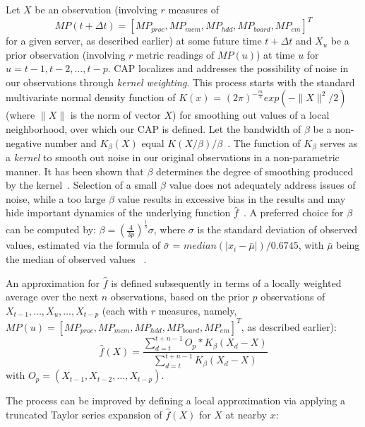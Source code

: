 \documentclass[prodmode,acmtaco,pdftex]{acmsmall}
\begin{document}
Let $X$ be an observation (involving $r$ measures of 
\begin{equation*}
MP(t+\Delta t) =[MP_{proc},MP_{mem}, MP_{hdd}, MP_{board}, MP_{em}]^{T}
\end{equation*}
for a given server, as described earlier) at some future time $t+\Delta
t$ and $X_{u}$ be a prior observation (involving $r$ metric readings of
$MP(u)$) at time $u$ for $u=t-1, t-2, \dots, t-p$.  CAP localizes and
addresses the possibility of noise in our observations through
\textit{kernel weighting}.  This process starts with the standard
multivariate normal density function of $K(x)$ =
$(2\pi)^{-\frac{m}{2}}exp(-\|X\|^{2}/2)$ (where $\|X\|$ is the norm of
vector $X$) for smoothing out values of a local neighborhood, over which
our CAP is defined.  Let the bandwidth of $\beta$ be a non-negative
number and $K_{\beta}(X)$ equal $K(X/\beta)/\beta$~\cite{Fan1996}.  The
function of $K_{\beta}$ serves as a \textit{kernel} to smooth out noise
in our original observations in a non-parametric manner.  It has been
shown that $\beta$ determines the degree of smoothing produced by the
kernel~\cite{Fan2005}.  Selection of a small $\beta$ value does not
adequately address issues of noise, while a too large $\beta$ value
results in excessive bias in the results and may hide important dynamics
of the underlying function $\hat{f}$~\cite{Turlach1993}.  A preferred
choice for $\beta$ can be computed by: $\beta =
\left(\frac{4}{3p}\right)^{\frac{1}{5}}\sigma$, where $\sigma$ is the
standard deviation of observed values, estimated via the formula of
$\bar{\sigma}$ = $median(|x_{i}-\bar{\mu}|)/0.6745$, with $\bar{\mu}$
being the median of observed values ~\cite{Bowman1997}.
 
An approximation for $\hat{f}$ is defined subsequently in terms of
a locally weighted average \cite{Box1994,Fan1996} over the next
$n$ observations, based on the prior $p$ observations of $X_{t-1},
\ldots, X_{u}, \ldots, X_{t-p}$ (each with $r$ measures, namely,
$MP(u) = \left[MP_{proc}, MP_{mem}, MP_{hdd}, MP_{board}, MP_{em}\right]^{T}$,
as described earlier):
  \begin{equation}
    \label{eq:localconst}
    \hat{f}(X)=\dfrac{\displaystyle\sum_{d=t}^{t+n-1}O_{p}*K_{\beta}(X_{d}-X)}{\displaystyle\sum_{d=t}^{t+n-1}K_{\beta}(X_{d}-X)}\nonumber
  \end{equation}
with $O_{p}=(X_{t-1}, X_{t-2}, \ldots, X_{t-p})$.
 
The process can be improved by defining a local approximation
via applying a truncated Taylor series expansion of $\hat{f}(X)$ for $X$ at nearby $x$:
\end{document}
